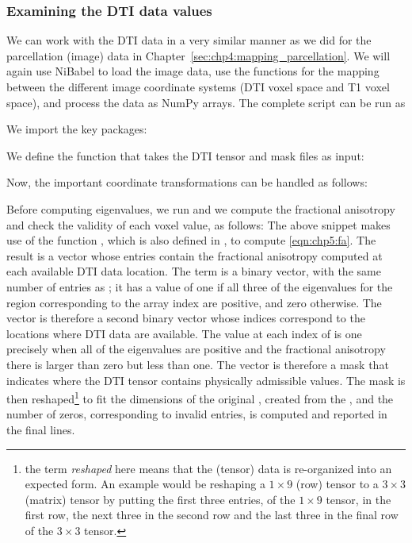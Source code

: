 \subsubsection*{Examining the DTI data values}
We can work with the DTI data in a very similar manner as we did
for the parcellation (image) data in
Chapter~\ref{sec:chp4:mapping_parcellation}. We will again use NiBabel
to load the image data, use the  functions for the mapping
between the different image coordinate systems (DTI voxel space and T1
voxel space), and process the data as NumPy arrays. The complete
script can be run as

We import the key packages:

\noindent We define the function  that takes the DTI
tensor and mask files as input: 

\noindent Now, the important coordinate transformations can be handled as follows:

\noindent Before computing eigenvalues, we run
and we compute the fractional anisotropy and check the validity of each voxel value, as follows:
The above snippet makes use of the function , which is also 
defined in , to compute \eqref{eqn:chp5:fa}.  The result is 
a vector  whose entries contain the fractional anisotropy computed at 
each available DTI data location. The term  is a binary vector, with the 
same number of entries as ; it has a value of one if all three of the eigenvalues 
for the region corresponding to the array index are positive, and zero otherwise. 
The vector  is therefore a second binary vector whose indices correspond 
to the locations where DTI data are available.  The value at each index of  
is one precisely when all of the eigenvalues are positive and the fractional anisotropy 
there is larger than zero but less than one.  The  vector is therefore 
a mask that indicates where the DTI tensor contains physically admissible values.
The  mask is then reshaped\footnote{the term \textit{reshaped} here 
means that the (tensor) data is re-organized into an expected form. An example 
would be reshaping a $1\times 9$ (row) tensor to a $3\times 3$ (matrix) tensor 
by putting the first three entries, of the $1\times 9$ tensor, in the first 
row, the next three in the second row and the last three in the final row of 
the $3\times 3$ tensor.} 
to fit the dimensions of the original , created from the 
, and the number of zeros, corresponding to invalid entries, is 
computed and reported in the final lines.

